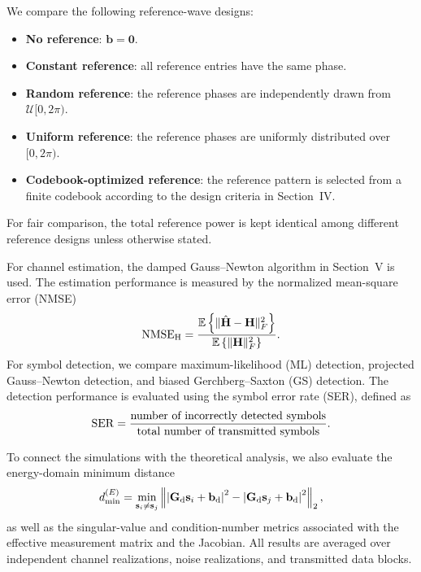 \documentclass[journal]{IEEEtran}
\begin{document}
We compare the following reference-wave designs:
\begin{itemize}
    \item \textbf{No reference}: $\mathbf{b}=\mathbf{0}$.
    \item \textbf{Constant reference}: all reference entries have the same phase.
    \item \textbf{Random reference}: the reference phases are independently drawn from $\mathcal{U}[0,2\pi)$.
    \item \textbf{Uniform reference}: the reference phases are uniformly distributed over $[0,2\pi)$.
    \item \textbf{Codebook-optimized reference}: the reference pattern is selected from a finite codebook according to the design criteria in Section~IV.
\end{itemize}
For fair comparison, the total reference power is kept identical among different reference designs unless otherwise stated.

For channel estimation, the damped Gauss--Newton algorithm in Section~V is used. 
The estimation performance is measured by the normalized mean-square error (NMSE)
\begin{equation}
{\rm NMSE}_{\rm H}
=
\frac{
\mathbb{E}\left\{
\|\hat{\mathbf{H}}-\mathbf{H}\|_F^2
\right\}
}{
\mathbb{E}\left\{
\|\mathbf{H}\|_F^2
\right\}
}.
\label{eq:simulation_nmse}
\end{equation}
For symbol detection, we compare maximum-likelihood (ML) detection, projected Gauss--Newton detection, and biased Gerchberg--Saxton (GS) detection. 
The detection performance is evaluated using the symbol error rate (SER), defined as
\begin{equation}
{\rm SER}
=
\frac{
\text{number of incorrectly detected symbols}
}{
\text{total number of transmitted symbols}
}.
\label{eq:simulation_ser}
\end{equation}

To connect the simulations with the theoretical analysis, we also evaluate the energy-domain minimum distance
\begin{equation}
d_{\min}^{(E)}
=
\min_{\mathbf{s}_i\neq\mathbf{s}_j}
\left\|
\left|
\mathbf{G}_{\rm d}\mathbf{s}_i+\mathbf{b}_{\rm d}
\right|^2
-
\left|
\mathbf{G}_{\rm d}\mathbf{s}_j+\mathbf{b}_{\rm d}
\right|^2
\right\|_2,
\label{eq:simulation_dmin}
\end{equation}
as well as the singular-value and condition-number metrics associated with the effective measurement matrix and the Jacobian. 
All results are averaged over independent channel realizations, noise realizations, and transmitted data blocks.
\end{document}
